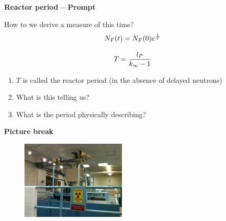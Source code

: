 \documentclass[aspectratio=1610,pdftex,dvipsnames,compress,xcolor={dvipsnames}]{beamer}
\begin{document}
\begin{frame}[plain]{}
    \centering\LARGE\textbf{Reactor period -- Prompt}
\end{frame}


\addtocounter{framenumber}{-1} 
\begin{frame}{How to we derive a measure of this time?}
    \begin{equation}
        \LARGE
        N_F(t)=N_F(0)e^{\frac{t}{T}}
    \end{equation}

    \begin{equation}
        \LARGE
        T = \frac{l_P}{k_\infty - 1}
    \end{equation}

    \vspace*{\fill}

    \begin{enumerate}[series=outerlist,topsep=0pt,itemsep=21pt,leftmargin=*,label=(\arabic*)]
        \item[]$T$ is called the reactor period (in the absence of delayed neutrons)
        \item[]What is this telling us?
        \item[]What is the period physically describing?
    \end{enumerate}
\end{frame}


\begin{frame}[plain]{}
    \centering\LARGE\textbf{Picture break}
\end{frame}


\addtocounter{framenumber}{-1} 
\begin{frame}{}
    \begin{figure}
        \centering
        \includegraphics[width=0.45\textwidth]{wpi.bridge.jpg}
    \end{figure}
\end{frame}
\end{document}
